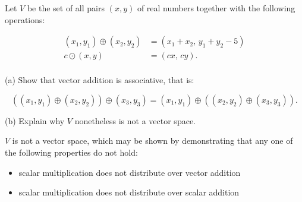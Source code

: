 
\begin{exerciseStatement}


 Let \(V\) be the set of all pairs \((x,y)\) of real numbers together with the following operations: 


\begin{align*} (x_1,y_1)\oplus (x_2,y_2)&= \left(x_{1} + x_{2},\,y_{1} + y_{2} - 5\right)  \\c \odot (x,y) &= \left(c x,\,c y\right) . \\ \end{align*}
            

 (a) Show that vector addition is associative, that is: 

\[\left((x_1,y_1)\oplus(x_2,y_2)\right)\oplus(x_3,y_3)=(x_1,y_1)\oplus\left((x_2,y_2)\oplus(x_3,y_3)\right).
    \]

 (b) Explain why \(V\) nonetheless is not a vector space. 


\end{exerciseStatement}
    
\begin{exerciseAnswer} 


\(V\) is not a vector space, which may be shown by demonstrating that any one of the following properties do not hold: 


\begin{itemize}
\item scalar multiplication does not distribute over vector addition
\item scalar multiplication does not distribute over scalar addition
\end{itemize}
    
\end{exerciseAnswer}
    
